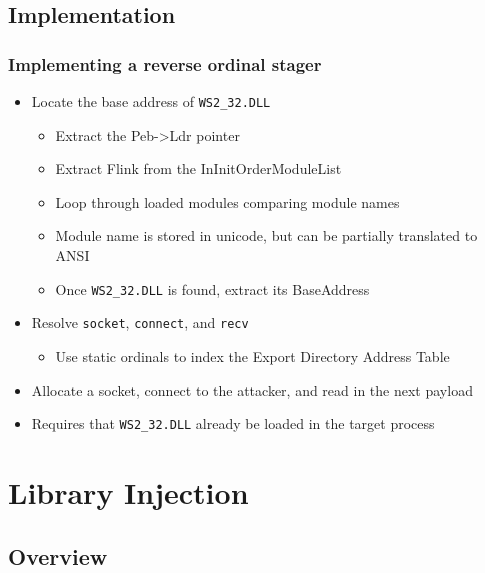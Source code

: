 \documentclass{beamer}
\newenvironment{sitemize}{\vspace{1mm}\begin{itemize}\itemsep 4pt\small}{\end{itemize}}
\begin{document}
\subsection{Implementation}
\begin{frame}[t]
    \frametitle{Implementing a reverse ordinal stager}

    \begin{sitemize}
        \item Locate the base address of \texttt{WS2\_32.DLL}
        \begin{sitemize}
            \item Extract the Peb->Ldr pointer
            \item Extract Flink from the InInitOrderModuleList
            \item Loop through loaded modules comparing module names
            \item Module name is stored in unicode, but can be
            partially translated to ANSI
            \item Once \texttt{WS2\_32.DLL} is found, extract its
            BaseAddress
        \end{sitemize}

        \pause
        \item Resolve \texttt{socket}, \texttt{connect},
        and \texttt{recv}
        \begin{sitemize}
            \item Use static ordinals to index the Export Directory Address Table
        \end{sitemize}

        \pause
        \item Allocate a socket, connect to the attacker,
        and read in the next payload

        \pause
        \item Requires that \texttt{WS2\_32.DLL} already be loaded
        in the target process
    \end{sitemize}

\end{frame}


\section{Library Injection}

\subsection{Overview}
\end{document}
